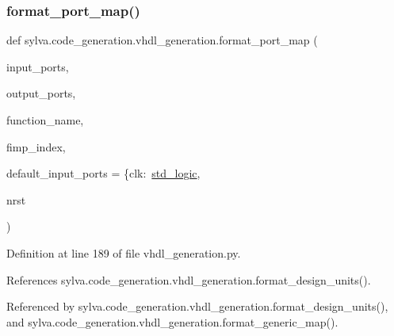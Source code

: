\subsubsection{\texorpdfstring{format\+\_\+port\+\_\+map()}{format\_port\_map()}}
{\footnotesize\ttfamily def sylva.\+code\+\_\+generation.\+vhdl\+\_\+generation.\+format\+\_\+port\+\_\+map (\begin{DoxyParamCaption}\item[{}]{input\+\_\+ports,  }\item[{}]{output\+\_\+ports,  }\item[{}]{function\+\_\+name,  }\item[{}]{fimp\+\_\+index,  }\item[{}]{default\+\_\+input\+\_\+ports = {\ttfamily \{\textquotesingle{}clk\textquotesingle{}\+:~\textquotesingle{}\hyperlink{namespacesylva_1_1code__generation_1_1vhdl__generation_a85e74939ca684a8a978805b5918467c8}{std\+\_\+logic}\textquotesingle{}},  }\item[{}]{nrst }\end{DoxyParamCaption})}



Definition at line 189 of file vhdl\+\_\+generation.\+py.



References sylva.\+code\+\_\+generation.\+vhdl\+\_\+generation.\+format\+\_\+design\+\_\+units().



Referenced by sylva.\+code\+\_\+generation.\+vhdl\+\_\+generation.\+format\+\_\+design\+\_\+units(), and sylva.\+code\+\_\+generation.\+vhdl\+\_\+generation.\+format\+\_\+generic\+\_\+map().


